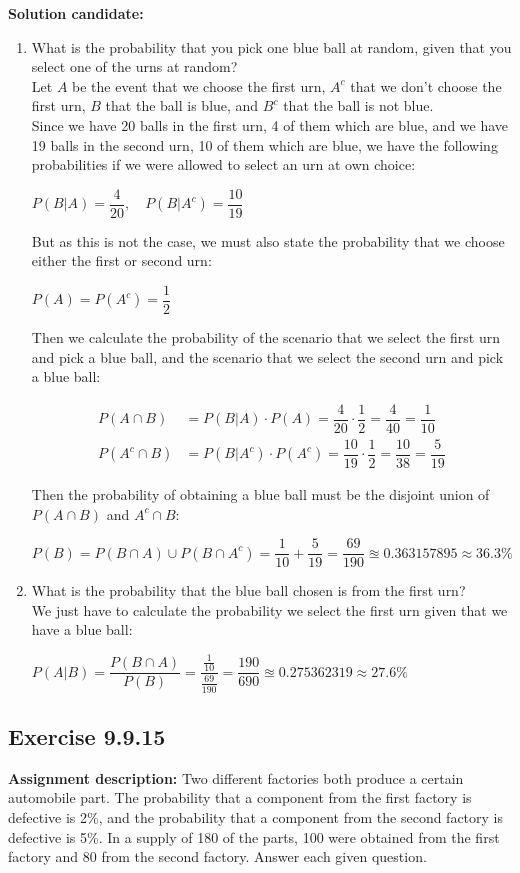 \documentclass{report}
\newcommand{\cent}[1]{\begin{center}#1\end{center}}
\newcommand{\mAlign}[1]{\begin{align*}#1\end{align*}}
\newcommand{\AssignmentDescription}{\textbf{Assignment description: }}
\newcommand{\Solution}{\textbf{Solution candidate: }}
\newcommand{\Exercise}[1]{\subsection{Exercise #1}}
\newcommand{\defaultEnumerateLabel}{\textbf{\alph*.}}
\newcommand{\MyItem}[1]{\item #1\\}
\newcommand{\LetterEnumeration}[1]{\begin{enumerate}[label = \defaultEnumerateLabel]
		#1
\end{enumerate}}
\begin{document}
 	\Solution
 	\LetterEnumeration{
 		\MyItem{What is the probability that you pick one blue ball at random, given that you select one of the urns at random?}
 		
 		Let $A$ be the event that we choose the first urn, $A^c$ that we don't choose the first urn, $B$ that the ball is blue, and $B^c$ that the ball is not blue.\\
 		
 		Since we have 20 balls in the first urn, 4 of them which are blue, and we have 19 balls in the second urn,  10 of them which are blue, we have the following probabilities if we were allowed to select an urn at own choice:
 		
 		\cent{$P(B | A) = \dfrac{4}{20}, \quad P(B | A^c) = \dfrac{10}{19} $}
 		
 		But as this is not the case, we must also state the probability that we choose either the first or second urn:
 		
 		\cent{$P(A) = P(A^c) = \dfrac{1}{2}$}
 		
 		Then we calculate the probability of the scenario that we select the first urn and pick a blue ball, and the scenario that we select the second urn and pick a blue ball:
 		
 		\mAlign{
 			P(A \cap B) &= P(B|A) \cdot P(A) = \dfrac{4}{20} \cdot \dfrac{1}{2} = \dfrac{4}{40} = \dfrac{1}{10}\\
 			P(A^c \cap B) &= P(B|A^c) \cdot P(A^c) = \dfrac{10}{19} \cdot \dfrac{1}{2} = \dfrac{10}{38} = \dfrac{5}{19}
 		}
 		
 		Then the probability of obtaining a blue ball must be the disjoint union of $P(A \cap B)$ and $A^c \cap B$:
 		
 		\cent{$P(B) = P(B \cap A) \cup P(B \cap A^c) = \dfrac{1}{10} + \dfrac{5}{19}  = \dfrac{69}{190} \approxeq 0.363157895 \approx 36.3\%$}
 		
 		\MyItem{What is the probability that the blue ball chosen is from the first urn?}
 		
 		We just have to calculate the probability we select the first urn given that we have a blue ball:
 		
 		\cent{ $P(A | B) = \dfrac{P(B \cap A)}{P(B)} = \dfrac{\frac{1}{10}}{\frac{69}{190}} = \dfrac{190}{690} \approxeq  0.275362319 \approx 27.6\%$}
 	}
 	\Exercise{9.9.15}
 	\AssignmentDescription
 	Two different factories both produce a certain automobile part. The probability that a component from the first factory is defective is 2\%, and the probability that a component from the second factory is defective is 5\%. In a supply of 180 of the parts, 100 were obtained from the first factory and 80 from the second factory. Answer each given question.\\
 	
\end{document}
